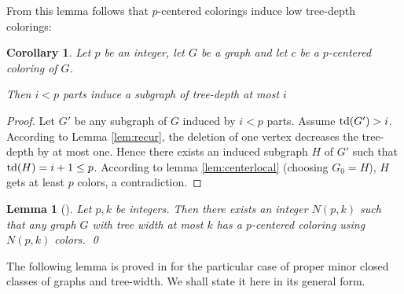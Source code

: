 \documentclass[a4paper]{amsart}
\newtheorem{lemma}[theorem]{Lemma}
\newtheorem{corollary}[theorem]{Corollary}
\theoremstyle{definition}
\theoremstyle{remark}
\DeclareMathOperator\depth{{\rm td}}
\begin{document}
From this lemma follows that $p$-centered colorings induce low
tree-depth colorings:

\begin{corollary}
\label{cor:c2t}
Let $p$ be an integer, let $G$ be a graph and let $c$ be a
$p$-centered coloring of $G$.

Then $i<p$ parts induce a subgraph of tree-depth at most $i$
\end{corollary}
\begin{proof}
Let $G'$ be any subgraph of $G$ induced by $i<p$ parts. 
Assume $\depth(G')>i$. According to Lemma \ref{lem:recur}, the
deletion of one vertex decreases the tree-depth by at most one. Hence
there exists an induced subgraph $H$ of $G'$ such that
$\depth(H)=i+1\leq p$.
According to lemma \ref{lem:centerlocal} (choosing $G_0=H$), $H$ gets
at least $p$ colors, a contradiction.
\end{proof}

\begin{lemma}[\cite{Taxi_tdepth}]
\label{lem:colortw}
Let $p,k$ be integers. Then there exists an integer $N(p,k)$ such
that any graph $G$ with tree width at most $k$ has a $p$-centered coloring using
$N(p,k)$ colors.
\qed
\end{lemma}

The following lemma is proved in \cite{Taxi_tdepth} for the particular
case of proper minor closed classes of graphs and tree-width. We
shall state it here in its general form.
\end{document}
